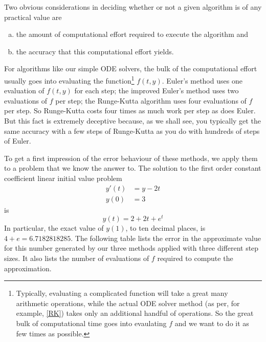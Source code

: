 Two obvious considerations in deciding whether or not  a given algorithm is of
any practical value are 
\begin{enumerate}[(a)] \itemsep1pt \parskip0pt  
\item 
the amount of computational effort required
to execute the algorithm and 
\item 
the accuracy that this computational effort
yields. 
\end{enumerate}
For algorithms like our simple ODE solvers, the bulk of the
computational effort usually goes into evaluating the 
function\footnote{Typically, evaluating a complicated function will take
a great many arithmetic operations, while the actual ODE solver method (as per,
for example, \eqref{RK}) takes only an additional handful of operations. 
So the great bulk of computational time goes into evaulating $f$ and we
want to do it as few times as possible.} $f(t,y)$.
Euler's method uses one evaluation of $f(t,y)$ for each step; the improved 
Euler's method uses two evaluations of $f$ per step; the Runge-Kutta algorithm
uses four evaluations of $f$ per step.  So Runge-Kutta costs four times
as much work per step as does Euler. But this fact is extremely deceptive
because, as we shall see, you typically get the same accuracy with a few
steps of Runge-Kutta as you do with hundreds of steps of Euler.

To get a first impression of the error behaviour of these methods, we
apply them to a problem that we know the answer to. The solution to the
first order constant coefficient linear initial value problem 
\begin{align*}
y'(t)&=y-2t \\
y(0)&=3
\end{align*}
is 
\begin{equation*}
y(t)=2+2t+e^t
\end{equation*}
In particular, the exact value of $y(1)$, to ten decimal places, is
$4+e=6.7182818285$. The following table lists the error in the approximate value 
for this number generated by our three methods applied with three different 
step sizes. It also lists the number of
evaluations of $f$ required to compute the approximation. 

